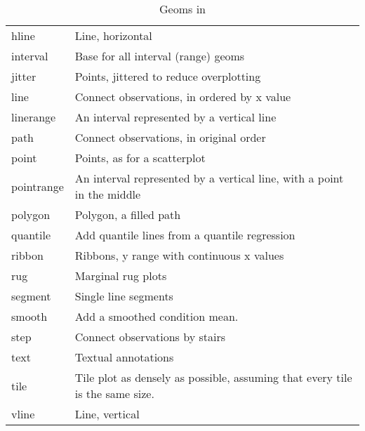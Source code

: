 \begin{table}
\begin{center}
\begin{tabular}{lp{3in}}
      hline        & Line, horizontal                                                             \\
      interval     & Base for all interval (range) geoms                                          \\
      jitter       & Points, jittered to reduce overplotting                                      \\
      line         & Connect observations, in ordered by x value                                  \\
      linerange    & An interval represented by a vertical line                                   \\
      path         & Connect observations, in original order                                      \\
      point        & Points, as for a scatterplot                                                 \\
      pointrange   & An interval represented by a vertical line, with a point in the middle       \\
      polygon      & Polygon, a filled path                                                       \\
      quantile     & Add quantile lines from a quantile regression                                \\
      ribbon       & Ribbons, y range with continuous x values                                    \\
      rug          & Marginal rug plots                                                           \\
      segment      & Single line segments                                                         \\
      smooth       & Add a smoothed condition mean.                                               \\
      step         & Connect observations by stairs                                               \\
      text         & Textual annotations                                                          \\
      tile         & Tile plot as densely as possible, assuming that every tile is the same size. \\
      vline        & Line, vertical                                                               \\
  
      \bottomrule
  \end{tabular}
  \end{center}
  \caption{Geoms in \ggplot}
  \label{tbl:geoms}
\end{table}


